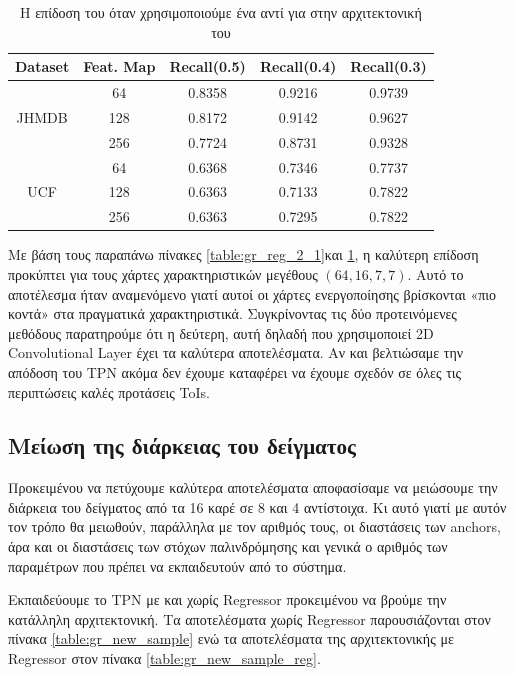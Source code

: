 \begin{table}[h]
  \centering
  \begin{tabular}{||c | c || c  c  c||}
    \hline
    \textbf{Dataset}  & \textbf{Feat. Map} & \textbf{Recall(0.5)} & \textbf{Recall(0.4)} & \textbf{Recall(0.3)}\\
    \hline
    \multirow{3}{*}{JHMDB} & 64 & 0.8358 & 0.9216 & 0.9739\\
    \cline{2-5}
    {} & 128 & 0.8172 & 0.9142 & 0.9627 \\
    \cline{2-5}
    {} & 256 & 0.7724 & 0.8731 & 0.9328 \\
    \hline
    \multirow{3}{*}{UCF} & 64 & 0.6368 & 0.7346 & 0.7737 \\ 
    \cline{2-5}
    {} & 128 & 0.6363 & 0.7133 & 0.7822 \\
    \cline{2-5}
    {} & 256 &  0.6363 & 0.7295 & 0.7822 \\
    \hline

  \end{tabular}
  \caption{\gr Η επίδοση του  όταν χρησιμοποιούμε ένα  αντί για  στην
    αρχιτεκτονική του }

  \label{table:gr_reg_2_2}
\end{table}
\gr

Με βάση τους παραπάνω πίνακες \en\ref{table:gr_reg_2_1}\gr και \en\ref{table:gr_reg_2_2}\gr, η καλύτερη επίδοση προκύπτει για τους χάρτες χαρακτηριστικών μεγέθους $(64,16,7,7)$. Αυτό το
αποτέλεσμα ήταν αναμενόμενο γιατί αυτοί οι χάρτες ενεργοποίησης βρίσκονται «πιο κοντά» στα πραγματικά χαρακτηριστικά. Συγκρίνοντας
τις δύο προτεινόμενες μεθόδους παρατηρούμε ότι η δεύτερη, αυτή δηλαδή που χρησιμοποιεί \en 2D Convolutional Layer \gr έχει τα καλύτερα
αποτελέσματα. Αν και βελτιώσαμε την απόδοση του \en TPN \gr ακόμα δεν έχουμε καταφέρει να έχουμε σχεδόν σε όλες τις περιπτώσεις
καλές προτάσεις \en ToIs\gr.
\subsection{Μείωση της διάρκειας του δείγματος}
Προκειμένου να πετύχουμε καλύτερα αποτελέσματα αποφασίσαμε να μειώσουμε την διάρκεια του δείγματος από τα 16 καρέ σε 8 και 4 αντίστοιχα. Κι
αυτό γιατί με αυτόν τον τρόπο θα μειωθούν, παράλληλα με τον αριθμός τους, οι διαστάσεις των \en anchors, \gr  άρα και οι διαστάσεις των στόχων παλινδρόμησης και γενικά ο αριθμός των παραμέτρων που πρέπει να εκπαιδευτούν από το σύστημα. \par
Εκπαιδεύουμε το \en TPN \gr με και χωρίς \en Regressor \gr προκειμένου να βρούμε την κατάλληλη αρχιτεκτονική. Τα αποτελέσματα χωρίς \en Regressor \gr
παρουσιάζονται στον πίνακα \ref{table:gr_new_sample} ενώ τα αποτελέσματα της αρχιτεκτονικής με \en Regressor \gr στον πίνακα \ref{table:gr_new_sample_reg}.

